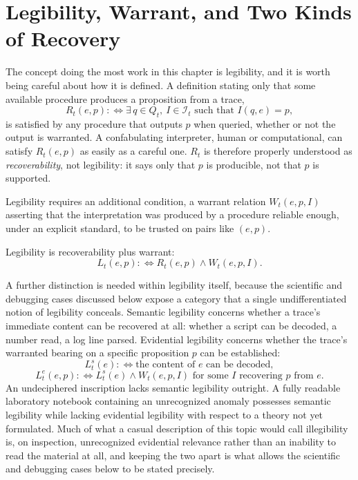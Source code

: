 \section{Legibility, Warrant, and Two Kinds of Recovery}
\label{sec:legibility}

The concept doing the most work in this chapter is legibility, and it is worth being careful about how it is defined. A definition stating only that some available procedure produces a proposition from a trace,
\[
R_t(e,p) :\Leftrightarrow \exists\, q \in Q_t,\ I \in \mathcal{I}_t \text{ such that } I(q,e) = p,
\]
is satisfied by any procedure that outputs $p$ when queried, whether or not the output is warranted. A confabulating interpreter, human or computational, can satisfy $R_t(e,p)$ as easily as a careful one. $R_t$ is therefore properly understood as \emph{recoverability}, not legibility: it says only that $p$ is producible, not that $p$ is supported.

Legibility requires an additional condition, a warrant relation $W_t(e,p,I)$ asserting that the interpretation was produced by a procedure reliable enough, under an explicit standard, to be trusted on pairs like $(e,p)$.

\begin{definition}[Legibility]
Legibility is recoverability plus warrant:
\[
L_t(e,p) :\Leftrightarrow R_t(e,p) \land W_t(e,p,I).
\]
\end{definition}

A further distinction is needed within legibility itself, because the scientific and debugging cases discussed below expose a category that a single undifferentiated notion of legibility conceals. Semantic legibility concerns whether a trace's immediate content can be recovered at all: whether a script can be decoded, a number read, a log line parsed. Evidential legibility concerns whether the trace's warranted bearing on a specific proposition $p$ can be established:
\[
L^s_t(e) :\Leftrightarrow \text{the content of } e \text{ can be decoded},
\]
\[
L^e_t(e,p) :\Leftrightarrow L^s_t(e) \land W_t(e,p,I) \text{ for some } I \text{ recovering } p \text{ from } e.
\]
An undeciphered inscription lacks semantic legibility outright. A fully readable laboratory notebook containing an unrecognized anomaly possesses semantic legibility while lacking evidential legibility with respect to a theory not yet formulated. Much of what a casual description of this topic would call illegibility is, on inspection, unrecognized evidential relevance rather than an inability to read the material at all, and keeping the two apart is what allows the scientific and debugging cases below to be stated precisely.

